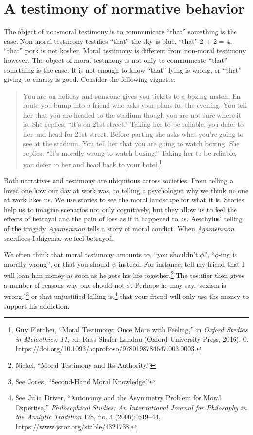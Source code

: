 \documentclass[phdthesis,12pt,final]{wuthesis}
\theoremstyle{definition}
\theoremstyle{definition}
\theoremstyle{definition}
\theoremstyle{definition}
\theoremstyle{remark}
\begin{document}
\section{A testimony of normative behavior}\label{a-testimony-of-normative-behavior}

The object of non-moral testimony is to communicate ``that'' something is the case. Non-moral testimony testifies ``that'' the sky is blue, ``that'' 2 + 2 = 4, ``that'' pork is not kosher. Moral testimony is different from non-moral testimony however. The object of moral testimony is not only to communicate ``that'' something is the case. It is not enough to know ``that'' lying is wrong, or ``that'' giving to charity is good. Consider the following vignette:

\begin{quote}
You are on holiday and someone gives you tickets to a boxing match. En route you bump into a friend who asks your plans for the evening. You tell her that you are headed to the stadium though you are not sure where it is. She replies: ``It's on 21st street.'' Taking her to be reliable, you defer to her and head for 21st street. Before parting she asks what you're going to see at the stadium. You tell her that you are going to watch boxing. She replies: ``It's morally wrong to watch boxing.'' Taking her to be reliable, you defer to her and head back to your hotel.\footnote{Guy Fletcher, {``Moral {Testimony}: {Once More} with {Feeling},''} in \emph{Oxford {Studies} in {Metaethics}: 11}, ed. Russ Shafer-Landau (Oxford University Press, 2016), 0, \url{https://doi.org/10.1093/acprof:oso/9780198784647.003.0003}.}
\end{quote}

Both narratives and testimony are ubiquitous across societies. From telling a loved one how our day at work was, to telling a psychologist why we think no one at work likes us. We use stories to see the moral landscape for what it is. Stories help us to imagine scenarios not only cognitively, but they allow us to feel the effects of betrayal and the pain of loss as if it happened to us. Aeschylus' telling of the tragedy \emph{Agamemnon} tells a story of moral conflict. When \emph{Agamemnon} sacrifices Iphigenia, we feel betrayed.

We often think that moral testimony amounts to, ``you shouldn't \(\phi\)'', ``\(\phi\)-ing is morally wrong'', or that you should \(\psi\) instead. For instance, tell my friend that I will loan him money as soon as he gets his life together.\footnote{Nickel, {``Moral {Testimony} and Its {Authority}.''}} The testifier then gives a number of reasons why one should not \(\phi\). Perhaps he may say, `sexism is wrong,'\footnote{See Jones, {``Second-{Hand Moral Knowledge}.''}} or that unjustified killing is,\footnote{See Julia Driver, {``Autonomy and the {Asymmetry Problem} for {Moral Expertise},''} \emph{Philosophical Studies: An International Journal for Philosophy in the Analytic Tradition} 128, no. 3 (2006): 619--44, \url{https://www.jstor.org/stable/4321738}.} that your friend will only use the money to support his addiction.
\end{document}

